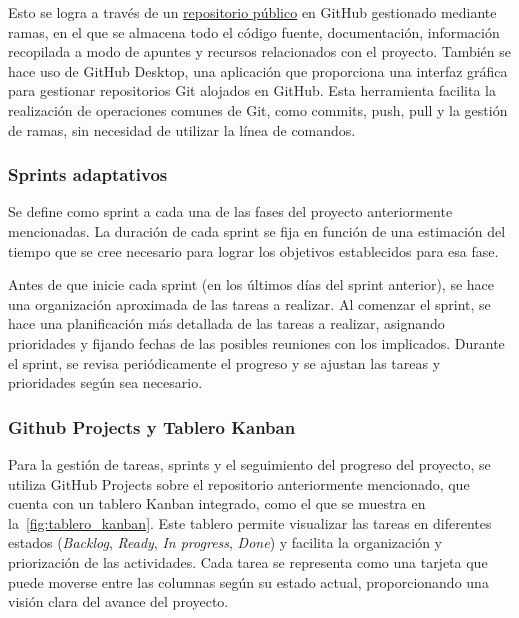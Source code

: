 Esto se logra a través de un \href{https://github.com/Thander11/TFG}{repositorio público} en GitHub gestionado mediante ramas, en el que se almacena todo el código fuente, documentación, información recopilada a modo de apuntes y recursos relacionados con el proyecto. También se hace uso de GitHub Desktop, una aplicación que proporciona una interfaz gráfica para gestionar repositorios Git alojados en GitHub. Esta herramienta facilita la realización de operaciones comunes de Git, como commits, push, pull y la gestión de ramas, sin necesidad de utilizar la línea de comandos.

\subsubsection{Sprints adaptativos}
Se define como sprint a cada una de las fases del proyecto anteriormente mencionadas. La duración de cada sprint se fija en función de una estimación del tiempo que se cree necesario para lograr los objetivos establecidos para esa fase.
\par

Antes de que inicie cada sprint (en los últimos días del sprint anterior), se hace una organización aproximada de las tareas a realizar. Al comenzar el sprint, se hace una planificación más detallada de las tareas a realizar, asignando prioridades y fijando fechas de las posibles reuniones con los implicados. Durante el sprint, se revisa periódicamente el progreso y se ajustan las tareas y prioridades según sea necesario.

\subsubsection{Github Projects y Tablero Kanban}

Para la gestión de tareas, sprints y el seguimiento del progreso del proyecto, se utiliza GitHub Projects sobre el repositorio anteriormente mencionado, que cuenta con un tablero Kanban integrado, como el que se muestra en la~\autoref{fig:tablero_kanban}. Este tablero permite visualizar las tareas en diferentes estados (\textit{Backlog}, \textit{Ready}, \textit{In progress}, \textit{Done}) y facilita la organización y priorización de las actividades. Cada tarea se representa como una tarjeta que puede moverse entre las columnas según su estado actual, proporcionando una visión clara del avance del proyecto.

